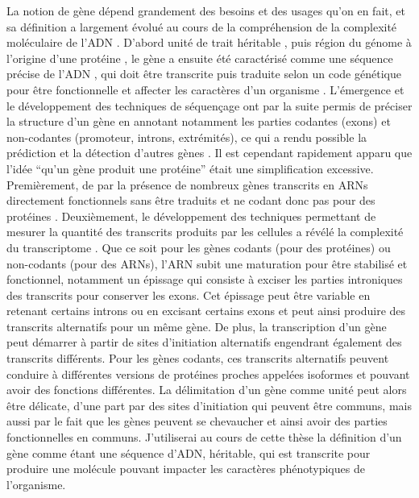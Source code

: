 La notion de gène dépend grandement des besoins et des usages qu’on en fait, et sa définition a largement évolué au cours de la compréhension de la complexité moléculaire de l’\acrshort{ADN} \citep{gerstein_what_2007}. D’abord unité de trait héritable \citep{mendel_verhandlungen_1866}, puis région du génome à l’origine d’une protéine \citep{morgan_mechanism_1915,beadle_genetic_1941}, le gène a ensuite été caractérisé comme une séquence précise de l’\acrshort{ADN} \citep{watson_molecular_1953}, qui doit être transcrite puis traduite selon un code génétique pour être fonctionnelle et affecter les caractères d’un organisme \citep{nirenberg_rna_1965}. L’émergence et le développement des techniques de séquençage ont par la suite permis de préciser la structure d’un gène en annotant notamment les parties codantes (exons) et non-codantes (promoteur, introns, extrémités), ce qui a rendu possible la prédiction et la détection d’autres gènes \citep{fiers_complete_1976, doolittle_urfs_1986}. Il est cependant rapidement apparu que l’idée “qu’un gène produit une protéine” était une simplification excessive. Premièrement, de par la présence de nombreux gènes transcrits en \acrshort{ARN}s directement fonctionnels sans être traduits et ne codant donc pas pour des protéines \citep{lander_initial_2001}. Deuxièmement, le développement des techniques permettant de mesurer la quantité des transcrits produits par les cellules a révélé la complexité du transcriptome \citep{birney_identification_2007, encode_project_consortium_integrated_2012}. Que ce soit pour les gènes codants (pour des protéines) ou non-codants (pour des \acrshort{ARN}s), l’\acrshort{ARN} subit une maturation pour être stabilisé et fonctionnel, notamment un épissage qui consiste à exciser les parties introniques des transcrits pour conserver les exons. Cet épissage peut être variable en retenant certains introns ou en excisant certains exons et peut ainsi produire des transcrits alternatifs pour un même gène. De plus, la transcription d’un gène peut démarrer à partir de sites d’initiation alternatifs engendrant également des transcrits différents. Pour les gènes codants, ces transcrits alternatifs peuvent conduire à différentes versions de protéines proches appelées isoformes et pouvant avoir des fonctions différentes. La délimitation d’un gène comme unité peut alors être délicate, d’une part par des sites d'initiation qui peuvent être communs, mais aussi par le fait que les gènes peuvent se chevaucher et ainsi avoir des parties fonctionnelles en communs. J’utiliserai au cours de cette thèse la définition d’un gène comme étant une séquence d’\acrshort{ADN}, héritable, qui est transcrite pour produire une molécule pouvant impacter les caractères phénotypiques de l’organisme. \\

